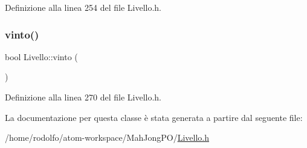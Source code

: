 Definizione alla linea 254 del file Livello.\+h.

\mbox{\label{class_livello_a160aa68abbc6445be4bbced74807e3a1}} 
\subsubsection{\texorpdfstring{vinto()}{vinto()}}
{\footnotesize\ttfamily bool Livello\+::vinto (\begin{DoxyParamCaption}{ }\end{DoxyParamCaption})\hspace{0.3cm}{\ttfamily [inline]}}



Definizione alla linea 270 del file Livello.\+h.



La documentazione per questa classe è stata generata a partire dal seguente file\+:\begin{DoxyCompactItemize}
\item 
/home/rodolfo/atom-\/workspace/\+Mah\+Jong\+P\+O/\hyperlink{_livello_8h}{Livello.\+h}\end{DoxyCompactItemize}

